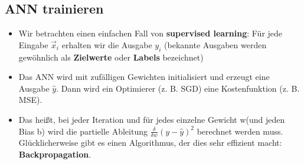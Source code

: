 \subsection{ANN trainieren}
\begin{itemize}
\item Wir betrachten einen einfachen Fall von \textbf{supervised learning}: Für jede Eingabe $\vec{x}_i$ erhalten wir die Ausgabe $y_i$ (bekannte Ausgaben werden gewöhnlich als \textbf{Zielwerte} oder \textbf{Labels} bezeichnet)
\item Das ANN wird mit zufälligen Gewichten initialisiert und erzeugt eine Ausgabe $\hat y$. Dann wird ein Optimierer (z. B. SGD) eine Kostenfunktion (z. B. MSE).
\item Das heißt, bei jeder Iteration und für jedes einzelne Gewicht w(und jeden Bias b) wird die partielle Ableitung $\frac{\delta}{\delta w}(y- \hat y)^2$ berechnet werden muss. Glücklicherweise gibt es einen Algorithmus, der dies sehr effizient macht: \textbf{Backpropagation}.
\end{itemize}
